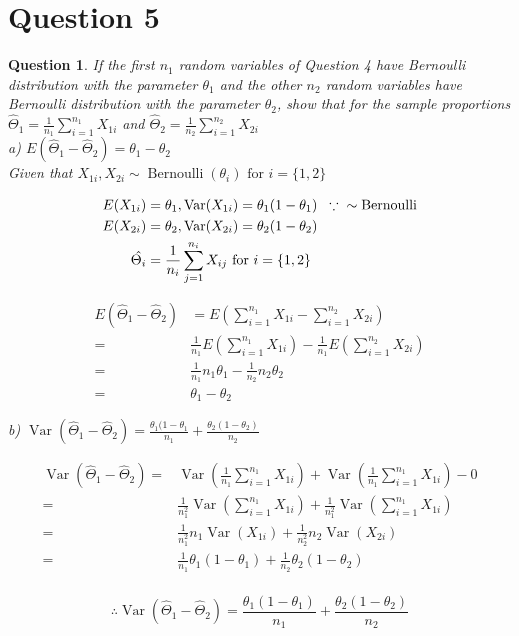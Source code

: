\documentclass{article}
\theoremstyle{questionstyle}
\newtheorem{myquestion}{Question}
\begin{document}
\section{Question 5}
\begin{myquestion}
If the first $n_1$ random variables of Question 4 have Bernoulli distribution with the parameter $\theta_1$ and the other $n_2$ random variables have Bernoulli distribution with the parameter $\theta_2$, show that for the sample proportions $\hat{\Theta}_1 = \frac{1}{n_1} \sum_{i=1}^{n_1} X_{1i}$ and $\hat{\Theta}_2 = \frac{1}{n_2} \sum_{i=1}^{n_2} X_{2i}$\\

a) \(E(\hat{\Theta}_1 - \hat{\Theta}_2) = \theta_1 - \theta_2\)\\

Given that \(X_{1i}, X_{2i} \sim \operatorname{Bernoulli}(\theta_i) \text{ for } i =\{ 1,2\} \)

\begin{align*}
    E(X_{1i}) &= \theta_1, \operatorname{Var}(X_{1i}) = \theta_1(1-\theta_1) \hspace{.2cm} \because \hspace{.2cm} \sim \operatorname{Bernoulli}\\
     E(X_{2i}) &= \theta_2, \operatorname{Var}(X_{2i}) = \theta_2(1-\theta_2)\\
    \hat{\Theta_i} &= \frac{1}{n_i} \sum_{j=1}^{n_i} X_{ij} \text{ for } i=\{1,2\}
\end{align*}

\begin{align*}
    E(\hat{\Theta}_1 - \hat{\Theta}_2) &= E\left( \sum_{i=1}^{n_1}X_{1i} - \sum_{i=1}^{n_2}X_{2i}\right)\\
    =& \frac{1}{n_1} E\left( \sum_{i=1}^{n_1}X_{1i}\right) - \frac{1}{n_1} E\left( \sum_{i=1}^{n_2}X_{2i}\right)\\ %
    =& \frac{1}{n_1} n_1\theta_1 - \frac{1}{n_2} n_2\theta_2\\
    =& \theta_1 - \theta_2
\end{align*}


b) $\operatorname{Var}(\hat{\Theta}_1 - \hat{\Theta}_2) = \frac{\theta_1(1-\theta_1}{n_1} + \frac{\theta_2(1-\theta_2)}{n_2}$

\begin{align*}
    \operatorname{Var}(\hat{\Theta}_1 - \hat{\Theta}_2) =& \operatorname{Var}\left(\frac{1}{n_1} \sum_{i=1}^{n_1} X_{1i}\right) + \operatorname{Var}\left(\frac{1}{n_1} \sum_{i=1}^{n_1} X_{1i}\right) - 0\\
    =& \frac{1}{n_1^2}\operatorname{Var}\left(\sum_{i=1}^{n_1} X_{1i}\right) + \frac{1}{n_1^2}\operatorname{Var}\left( \sum_{i=1}^{n_1} X_{1i}\right) \\
    =& \frac{1}{n_1^2}n_1\operatorname{Var}(X_{1i}) + \frac{1}{n_2^2}n_2\operatorname{Var}(X_{2i})\\
    =& \frac{1}{n_1} \theta_1(1-\theta_1) + \frac{1}{n_2}\theta_2(1-\theta_2)\\
\end{align*}

\[\therefore \operatorname{Var}(\hat{\Theta}_1 - \hat{\Theta}_2) = \frac{\theta_1(1-\theta_1)}{n_1} +  \frac{\theta_2(1-\theta_2)}{n_2}\]

\end{myquestion}%
\end{document}
